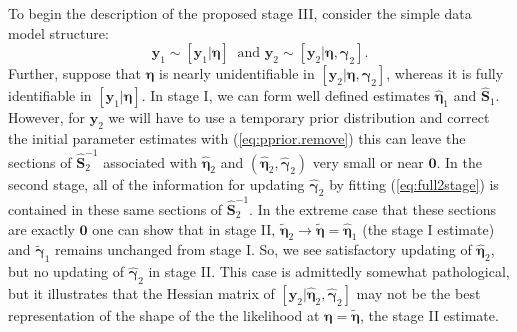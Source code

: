 \documentclass[12pt]{article}
\newcommand{\by}{\mathbf{y}}
\newcommand{\bn}{\boldsymbol{\eta}}
\newcommand{\bg}{\boldsymbol{\gamma}}
\newcommand{\bS}{\mathbf{S}}
\begin{document}
To begin the description of the proposed stage III, consider the simple data model structure:
\begin{equation}
\by_1 \sim [\by_1|\bn]\ \text{ and } \by_2 \sim [\by_2|\bn,\bg_2].
\end{equation} 
Further, suppose that $\bn$ is nearly unidentifiable in $[\by_2|\bn,\bg_2]$, whereas it is fully identifiable in $[\by_1|\bn]$. In stage I, we can form well defined estimates $\hat{\bn}_1$ and $\hat{\bS}_1$. However, for $\by_2$ we will have to use a temporary prior distribution and correct the initial parameter estimates with (\ref{eq:pprior.remove}) this can leave the sections of $\hat{\bS}_2^{-1}$ associated with $\hat{\bn}_2$ and $(\hat{\bn}_2, \hat{\bg}_2)$ very small or near $\mathbf{0}$. In the second stage, all of the information for updating $\hat{\bg}_2$ by fitting (\ref{eq:full2stage}) is contained in these same sections of $\hat{\bS}_2^{-1}$. In the extreme case that these sections are exactly $\mathbf{0}$ one can show that in stage II, $\tilde{\bn}_2 \to \tilde{\bn} = \hat{\bn}_1$ (the stage I estimate) and $\tilde{\bg}_1$ remains unchanged from stage I. So, we see satisfactory updating of $\hat{\bn}_2$, but no updating of $\hat{\bg}_2$ in stage II. This case is admittedly somewhat pathological, but it illustrates that the Hessian matrix of $[\by_2|\hat{\bn}_2, \hat{\bg}_2]$ may not be the best representation of the shape of the the likelihood at $\bn = \tilde{\bn}$, the stage II estimate. 
\end{document}
